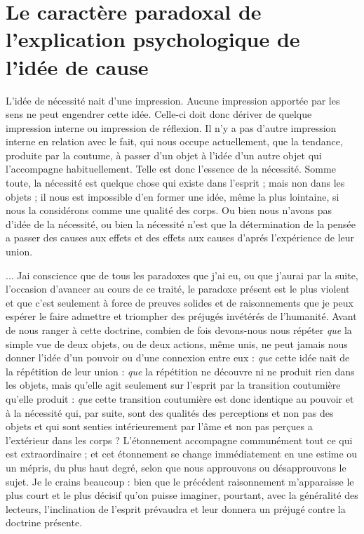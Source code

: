 
\section{Le caractère paradoxal de l'explication psychologique
de l'idée de cause}

L’idée de nécessité nait d’une impression. Aucune
impression apportée par les sens ne peut engendrer cette
idée. Celle-ci doit donc dériver de quelque impression
interne ou impression de réflexion. Il n’y a pas d’autre
impression interne en relation avec le fait, qui nous occupe
actuellement, que la tendance, produite par la coutume,
à passer d’un objet à l’idée d’un autre objet qui l’accompagne
habituellement. Telle est donc l’essence de la nécessité.
Somme toute, la nécessité est quelque chose qui existe
dans l’esprit ; mais non dans les objets ; il nous est impossible
d’en former une idée, même la plus lointaine, si nous
la considérons comme une qualité des corps. Ou bien nous
n’avons pas d’idée de la nécessité, ou bien la nécessité
n'est que la détermination de la pensée a passer des causes
aux effets et des effets aux causes d'aprés l’expérience de
leur union.

... Jai conscience que de tous les paradoxes que j’ai
eu, ou que j’aurai par la suite, l’occasion d’avancer au
cours de ce traité, le paradoxe présent est le plus violent
et que c’est seulement à force de preuves solides et de
raisonnements que je peux espérer le faire admettre et
triompher des préjugés invétérés de l’humanité. Avant
de nous ranger à cette doctrine, combien de fois devons-nous
nous répéter {\it que} la simple vue de deux objets, ou
de deux actions, même unis, ne peut jamais nous donner
l'idée d’un pouvoir ou d’une connexion entre eux : {\it que}
cette idée nait de la répétition de leur union : {\it que} la répétition
ne découvre ni ne produit rien dans les objets, mais
qu’elle agit seulement sur l’esprit par la transition coutumière
qu’elle produit : {\it que} cette transition coutumière
est donc identique au pouvoir et à la nécessité qui, par
suite, sont des qualités des perceptions et non pas des
objets et qui sont senties intérieurement par l’âme et
non pas perçues a l’extérieur dans les corps ? L’étonnement
accompagne communément tout ce qui est extraordinaire ;
et cet étonnement se change immédiatement en une
estime ou un mépris, du plus haut degré, selon que nous
approuvons ou désapprouvons le sujet. Je le crains
beaucoup : bien que le précédent raisonnement m’apparaisse
le plus court et le plus décisif qu’on puisse imaginer,
pourtant, avec la généralité des lecteurs, l’inclination de
l'esprit prévaudra et leur donnera un préjugé contre la
doctrine présente.

